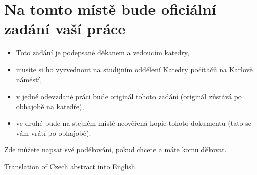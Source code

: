 \documentclass[11pt,twoside,a4paper]{book}
\begin{document}
	
	\translate				%

	{
	 \cleardoublepage \thispagestyle{empty}
	\chapter*{Na tomto místě bude oficiální zadání vaší práce}
	\begin{itemize}
		\item Toto zadání je podepsané děkanem a vedoucím katedry,
		\item musíte si ho vyzvednout na studijním oddělení Katedry počítačů na Karlově náměstí,
		\item v jedné odevzdané práci bude originál tohoto zadání (originál zůstává po obhajobě na katedře),
		\item ve druhé bude na stejném místě neověřená kopie tohoto dokumentu (tato se vám vrátí po obhajobě).
	\end{itemize}
	\newpage
	}

	\coverpagestarts


	\acknowledgements
	\noindent
	Zde můžete napsat své poděkování, pokud chcete a máte komu děkovat.





 
	\abstractpage

	Translation of Czech abstract into English.


	\baselineskip
\end{document}
